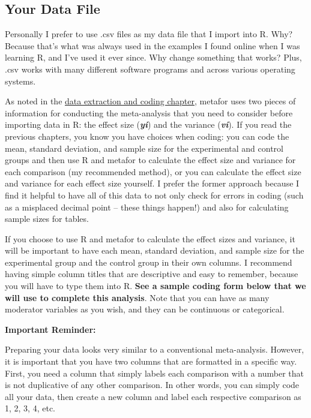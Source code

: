 \documentclass[
]{book}
\begin{document}
\hypertarget{your-data-file-1}{%
\subsection{Your Data File}\label{your-data-file-1}}

Personally I prefer to use .csv files as my data file that I import into R. Why? Because that's what was always used in the examples I found online when I was learning R, and I've used it ever since. Why change something that works? Plus, .csv works with many different software programs and across various operating systems. ~

As noted in the \protect\hyperlink{data}{data extraction and coding chapter}, metafor uses two pieces of information for conducting the meta-analysis that you need to consider before importing data in R: the effect size (\textbf{\emph{yi}}) and the variance (\textbf{\emph{vi}}). If you read the previous chapters, you know you have choices when coding: you can code the mean, standard deviation, and sample size for the experimental and control groups and then use R and metafor to calculate the effect size and variance for each comparison (my recommended method), or you can calculate the effect size and variance for each effect size yourself. I prefer the former approach because I find it helpful to have all of this data to not only check for errors in coding (such as a misplaced decimal point -- these things happen!) and also for calculating sample sizes for tables.

If you choose to use R and metafor to calculate the effect sizes and variance, it will be important to have each mean, standard deviation, and sample size for the experimental group and the control group in their own columns. I recommend having simple column titles that are descriptive and easy to remember, because you will have to type them into R. \textbf{See a sample coding form below that we will use to complete this analysis}. Note that you can have as many moderator variables as you wish, and they can be continuous or categorical.

\textbf{Important Reminder:}

Preparing your data looks very similar to a conventional meta-analysis. However, it is important that you have two columns that are formatted in a specific way. First, you need a column that simply labels each comparison with a number that is not duplicative of any other comparison. In other words, you can simply code all your data, then create a new column and label each respective comparison as 1, 2, 3, 4, etc.
\end{document}
